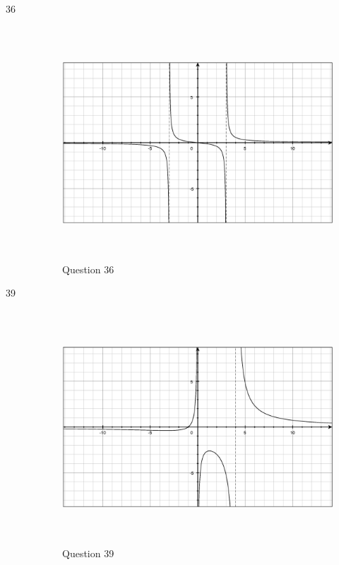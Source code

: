 \documentclass[fleqn,addpoints]{exam}
\begin{document}
\begin{description}
\item[36]
\begin{figure}[H]
  \centering
  \includegraphics[width=12.25cm,height=8.75cm]{question36.eps}
  \caption*{Question 36}
\end{figure}

\item[39]
\begin{figure}[H]
  \centering
  \includegraphics[width=12.25cm,height=8.75cm]{question39.eps}
  \caption*{Question 39}
\end{figure}


\end{description}
\end{document}
